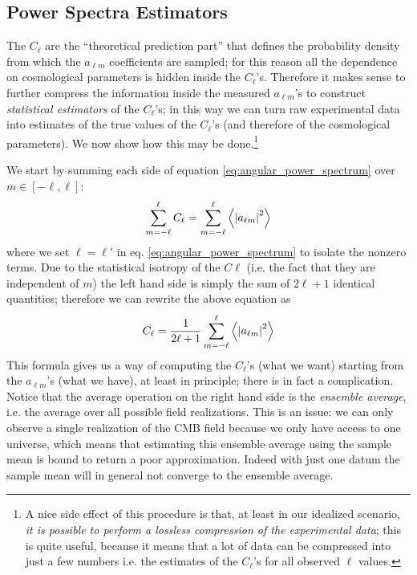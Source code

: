\subsection{Power Spectra Estimators}
The $C_\ell$ are the ``theoretical prediction part'' that defines the probability density from which the $a_{\ell m}$ coefficients are sampled; for this reason all the dependence on cosmological parameters is hidden inside the $C_\ell$'s. Therefore it makes sense to further compress the information inside the measured $a_{\ell m}$'s to construct \emph{statistical estimators} of the $C_\ell$'s; in this way we can turn raw experimental data into estimates of the true values of the $C_\ell$'s (and therefore of the cosmological parameters). 
We now show how this may be done.\footnote{A nice side effect of this procedure is that, at least in our idealized scenario, \emph{it is possible to perform a lossless compression of the experimental data}; this is quite useful, because it means that a lot of data can be compressed into just a few numbers i.e. the estimates of the $C_\ell$'s for all observed $\ell$ values.}

We start by summing each side of equation \eqref{eq:angular_power_spectrum} over $m \in [-\ell, \ell]$:
\begin{equation*}
    \sum_{m=-\ell}^\ell C_\ell = \sum_{m=-\ell}^\ell \expval{\abs{a_{\ell m}}^2}
\end{equation*}
where we set $\ell = \ell'$ in eq. \eqref{eq:angular_power_spectrum} to isolate the nonzero terms. 
Due to the statistical isotropy of the $C\ell$ (i.e. the fact that they are independent of $m$) the left hand side is simply the sum of $2\ell+1$ identical quantities; therefore we can rewrite the above equation as
\begin{equation*}
    C_\ell = \frac{1}{2\ell + 1}\sum_{m=-\ell}^\ell \expval{\abs{a_{\ell m}}^2}
\end{equation*}
This formula gives us a way of computing the $C_\ell$'s (what we want) starting from the $a_{\ell m}$'s (what we have), at least in principle; there is in fact a complication.
Notice that the average operation on the right hand side is the \emph{ensemble average}, i.e. the average over all possible field realizations. This is an issue: we can only observe a single realization of the CMB field because we only have access to one universe, which means that estimating this ensemble average using the sample mean is bound to return a poor approximation. Indeed with just one datum the sample mean will in general not converge to the ensemble average.

